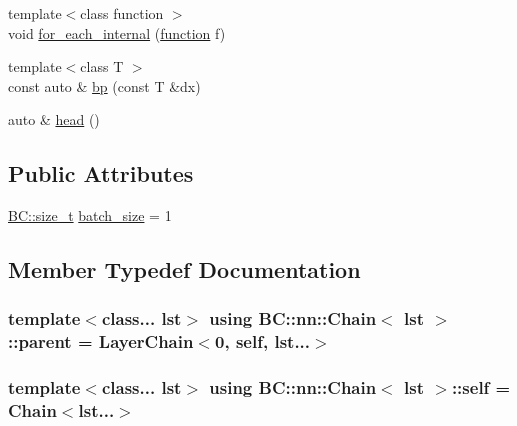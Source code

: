 \begin{DoxyCompactItemize}
\item 
{\footnotesize template$<$class function $>$ }\\void \hyperlink{structBC_1_1nn_1_1Chain_a7573d5305e385f2513d26650fb324c55}{for\+\_\+each\+\_\+internal} (\hyperlink{namespaceBC_1_1nn_a5429ceaa392776ade7234175af39050d}{function} f)
\item 
{\footnotesize template$<$class T $>$ }\\const auto \& \hyperlink{structBC_1_1nn_1_1Chain_a10264f8ac106cdc4fb3a393e3c84cad7}{bp} (const T \&dx)
\item 
auto \& \hyperlink{structBC_1_1nn_1_1Chain_a1aaa64c33e9902b0db045bdc20f8d488}{head} ()
\end{DoxyCompactItemize}
\subsection*{Public Attributes}
\begin{DoxyCompactItemize}
\item 
\hyperlink{namespaceBC_a6007cbc4eeec401a037b558910a56173}{B\+C\+::size\+\_\+t} \hyperlink{structBC_1_1nn_1_1Chain_ab36fdf102bb73c6c0f22aa8ede632fd9}{batch\+\_\+size} = 1
\end{DoxyCompactItemize}


\subsection{Member Typedef Documentation}
\subsubsection[{\texorpdfstring{parent}{parent}}]{\setlength{\rightskip}{0pt plus 5cm}template$<$class... lst$>$ using {\bf B\+C\+::nn\+::\+Chain}$<$ lst $>$\+::{\bf parent} =  {\bf Layer\+Chain}$<$0, {\bf self}, lst...$>$}\hypertarget{structBC_1_1nn_1_1Chain_a61348985f8615b90024f8206bb37c9b5}{}\label{structBC_1_1nn_1_1Chain_a61348985f8615b90024f8206bb37c9b5}
\subsubsection[{\texorpdfstring{self}{self}}]{\setlength{\rightskip}{0pt plus 5cm}template$<$class... lst$>$ using {\bf B\+C\+::nn\+::\+Chain}$<$ lst $>$\+::{\bf self} =  {\bf Chain}$<$lst...$>$}\hypertarget{structBC_1_1nn_1_1Chain_a921489965d26e0a38dc0e44d9224ff11}{}\label{structBC_1_1nn_1_1Chain_a921489965d26e0a38dc0e44d9224ff11}



